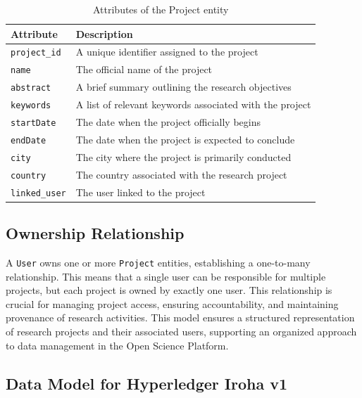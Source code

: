 \documentclass{article}
\begin{document}
\begin{table}[h]
      \centering
      \caption{Attributes of the Project entity}
      \label{tab:project_attributes}
      \begin{tabular}{|l|l|}
            \hline
            \textbf{Attribute}    & \textbf{Description}                                    \\ \hline
            \texttt{project\_id}  & A unique identifier assigned to the project             \\ \hline
            \texttt{name}         & The official name of the project                        \\ \hline
            \texttt{abstract}     & A brief summary outlining the research objectives       \\ \hline
            \texttt{keywords}     & A list of relevant keywords associated with the project \\ \hline
            \texttt{startDate}    & The date when the project officially begins             \\ \hline
            \texttt{endDate}      & The date when the project is expected to conclude       \\ \hline
            \texttt{city}         & The city where the project is primarily conducted       \\ \hline
            \texttt{country}      & The country associated with the research project        \\ \hline
            \texttt{linked\_user} & The user linked to the project                          \\ \hline
      \end{tabular}
\end{table}

\subsection{Ownership Relationship}
A \texttt{User} owns one or more \texttt{Project} entities, establishing a one-to-many relationship. This means that a single user can be responsible for multiple projects, but each project is owned by exactly one user. This relationship is crucial for managing project access, ensuring accountability, and maintaining provenance of research activities. This model ensures a structured representation of research projects and their associated users, supporting an organized approach to data management in the Open Science Platform.

\subsection{ Data Model for Hyperledger Iroha v1}
\end{document}
